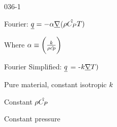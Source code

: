 \begin{mitframe}{036-1}

 	
    \begin{listone}
 
    	\item Fourier: $\underline{\heatflux} = -\tdiff\gradop$($\dens\hat{\cp}\Temp)$ 
    
    	\begin{listtwo}
        
        	\item Where $\tdiff \equiv \bigg(\frac{\thermcond}{\dens\hat{cp}}\bigg)$

		\end{listtwo}
    
    	\item Fourier Simplified: $\underline{\heatflux}$ = -$\thermcond\gradop\Temp)$ 
        
        \begin{listtwo}
        
        	\item Pure material, constant isotropic $\thermcond$
        
        	\item Constant $\dens\hat{\cp}$
        
        	\begin{listthree}
			
           		\item Constant pressure
			
            	\end{listthree}      	

		\end{listtwo}
        
\end{listone}        
        
\end{mitframe}

